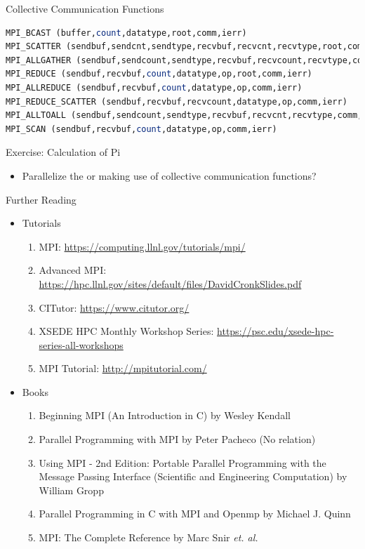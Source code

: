 \documentclass[10pt,t]{beamer}
\begin{document}
\begin{frame}{Collective Communication Functions}
  \begin{lstlisting}[basicstyle=\footnotesize\ttfamily,language=Fortran]
MPI_BCAST (buffer,count,datatype,root,comm,ierr)
MPI_SCATTER (sendbuf,sendcnt,sendtype,recvbuf,recvcnt,recvtype,root,comm,ierr)MPI_GATHER (sendbuf,sendcnt,sendtype,recvbuf,recvcount,recvtype,root,comm,ierr)
MPI_ALLGATHER (sendbuf,sendcount,sendtype,recvbuf,recvcount,recvtype,comm,info)
MPI_REDUCE (sendbuf,recvbuf,count,datatype,op,root,comm,ierr)
MPI_ALLREDUCE (sendbuf,recvbuf,count,datatype,op,comm,ierr)
MPI_REDUCE_SCATTER (sendbuf,recvbuf,recvcount,datatype,op,comm,ierr)
MPI_ALLTOALL (sendbuf,sendcount,sendtype,recvbuf,recvcnt,recvtype,comm,ierr)
MPI_SCAN (sendbuf,recvbuf,count,datatype,op,comm,ierr)
  \end{lstlisting}
\end{frame}

\begin{frame}{Exercise: Calculation of Pi}
  \begin{itemize}
    \item Parallelize the  or  making use of collective communication functions?
  \end{itemize}
\end{frame}

\begin{frame}{Further Reading}
  \begin{itemize}
    \item Tutorials
    \begin{enumerate}
      \item MPI: \url{https://computing.llnl.gov/tutorials/mpi/}
      \item Advanced MPI: \url{https://hpc.llnl.gov/sites/default/files/DavidCronkSlides.pdf}
      \item CITutor: \url{https://www.citutor.org/}
      \item XSEDE HPC Monthly Workshop Series: \url{https://psc.edu/xsede-hpc-series-all-workshops}
      \item MPI Tutorial: \url{http://mpitutorial.com/}
    \end{enumerate}
    \item Books
    \begin{enumerate}
      \item Beginning MPI (An Introduction in C) by Wesley Kendall
      \item Parallel Programming with MPI by Peter Pacheco (No relation)
      \item Using MPI - 2nd Edition: Portable Parallel Programming with the Message Passing Interface (Scientific and Engineering Computation) by William Gropp
      \item Parallel Programming in C with MPI and Openmp by Michael J. Quinn
      \item MPI: The Complete Reference by Marc Snir \textit{et. al.}
    \end{enumerate}
  \end{itemize}
\end{frame}
\end{document}
